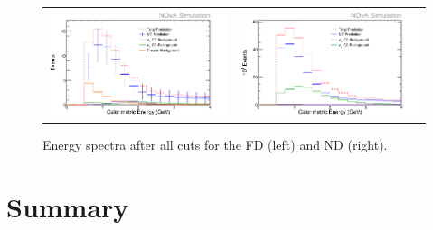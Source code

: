 \begin{figure}[htb]
  \centering
  \begin{tabular}{c c}
    \includegraphics[width=.47\textwidth]{figures/SelE/RecoE5FD.png} &
    \includegraphics[width=.47\textwidth]{figures/SelE/RecoE5ND.png} \\
  \end{tabular}
  \caption[Energy Spectra After All Cuts]{Energy spectra after all cuts for the FD (left) and ND (right).}
  \label{fig:Sel}
\end{figure}

\section{Summary}

